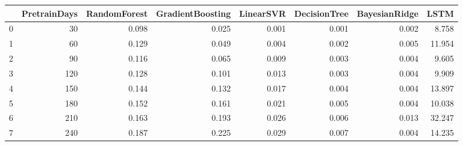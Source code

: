 \begin{tabular}{lrrrrrrr}
\toprule
{} &  PretrainDays &  RandomForest &  GradientBoosting &  LinearSVR &  DecisionTree &  BayesianRidge &   LSTM \\
\midrule
0 &            30 &         0.098 &             0.025 &      0.001 &         0.001 &          0.002 &  8.758 \\
1 &            60 &         0.129 &             0.049 &      0.004 &         0.002 &          0.005 & 11.954 \\
2 &            90 &         0.116 &             0.065 &      0.009 &         0.003 &          0.004 &  9.605 \\
3 &           120 &         0.128 &             0.101 &      0.013 &         0.003 &          0.004 &  9.909 \\
4 &           150 &         0.144 &             0.132 &      0.017 &         0.004 &          0.004 & 13.897 \\
5 &           180 &         0.152 &             0.161 &      0.021 &         0.005 &          0.004 & 10.038 \\
6 &           210 &         0.163 &             0.193 &      0.026 &         0.006 &          0.013 & 32.247 \\
7 &           240 &         0.187 &             0.225 &      0.029 &         0.007 &          0.004 & 14.235 \\
\bottomrule
\end{tabular}
